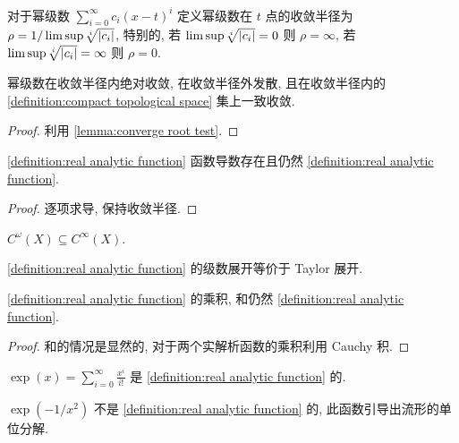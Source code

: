 \begin{definition}[收敛半径]
    对于幂级数 \(\sum_{i=0}^{\infty} c_i (x - t)^i\) 定义幂级数在 \(t\) 点的收敛半径为 \(\rho = 1/\limsup \sqrt[i]{\abs{c_i}}\),
    特别的, 若 \(\limsup \sqrt[i]{\abs{c_i}} = 0\) 则 \(\rho = \infty\), 若 \(\limsup \sqrt[i]{\abs{c_i}} = \infty\) 则 \(\rho = 0\).
\end{definition}

\begin{lemma}
    幂级数在收敛半径内绝对收敛, 在收敛半径外发散, 且在收敛半径内的 \ref{definition:compact topological space} 集上一致收敛.

    \begin{proof}
        利用 \ref{lemma:converge root test}.
    \end{proof}
\end{lemma}

\begin{lemma}
    \ref{definition:real analytic function} 函数导数存在且仍然 \ref{definition:real analytic function}.

    \begin{proof}
        逐项求导, 保持收敛半径.
    \end{proof}
\end{lemma}

\begin{corollary}
    \(C^\omega (X) \subseteq C^\infty (X)\).
\end{corollary}

\begin{corollary}
    \ref{definition:real analytic function} 的级数展开等价于 Taylor 展开.
\end{corollary}

\begin{lemma}
    \ref{definition:real analytic function} 的乘积, 和仍然 \ref{definition:real analytic function}.

    \begin{proof}
        和的情况是显然的, 对于两个实解析函数的乘积利用 Cauchy 积.
    \end{proof}
\end{lemma}

\begin{example}
    \(\exp (x) = \sum_{i=0}^{\infty} \frac{x^i}{i!}\) 是 \ref{definition:real analytic function} 的.
\end{example}

\begin{example}
    \(\exp (-1/x^2)\) 不是 \ref{definition:real analytic function} 的, 
    此函数引导出流形的单位分解.
\end{example}

